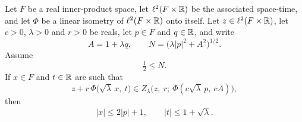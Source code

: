 \begin{lemma}
Let $F$ be a real inner-product space, let $\ell^2(F\times\mathbb{R})$ be the associated
space-time, and let $\Phi$ be a linear isometry of $\ell^2(F\times\mathbb{R})$ onto itself.
Let $z\in\ell^2(F\times\mathbb{R})$, let $c>0$, $\lambda>0$ and $r>0$ be reals, let $p\in F$
and $q\in\mathbb{R}$, and write
\[
  A=1+\lambda q,\qquad N=\bigl(\lambda|p|^2+A^2\bigr)^{1/2}.
\]
Assume
\begin{equation}\label{eq:fcnb-N}
  \tfrac12\le N .
\end{equation}
If $x\in F$ and $t\in\mathbb{R}$ are such that
\begin{equation}\label{eq:fcnb-mem}
  z+r\,\Phi\bigl(\sqrt\lambda\,x,\ t\bigr)
   \in Z_\lambda\bigl(z,\ r;\ \Phi(c\sqrt\lambda\,p,\ cA)\bigr),
\end{equation}
then
\[
  |x|\le2|p|+1,\qquad |t|\le1+\sqrt\lambda .
\]
\end{lemma}
